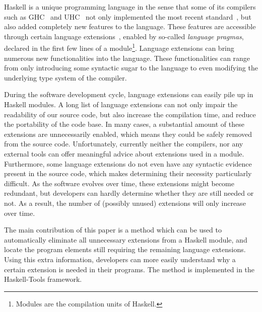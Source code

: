 \documentclass[main.tex]{subfiles}
\begin{document}
	
	Haskell is a unique programming language in the sense that some of its compilers such as GHC~\cite{ghc-bib} and UHC~\cite{uhc-bib} not only implemented the most recent standard~\cite{haskell2010-bib}, but also added completely new features to the language. These features are accessible through certain language extensions~\cite{ghc-users-guide-bib}, enabled by so-called \emph{language pragmas}, declared in the first few lines of a module\footnote{Modules are the compilation units of Haskell.}. Language extensions can bring numerous new functionalities into the language. These functionalities can range from only introducing some syntactic sugar to the language to even modifying the underlying type system of the compiler. 
	
	During the software development cycle, language extensions can easily pile up in Haskell modules. A long list of language extensions can not only impair the readability of our source code, but also increase the compilation time, and reduce the portability of the code base. In many cases, a substantial amount of these extensions are unnecessarily enabled, which means they could be safely removed from the source code. Unfortunately, currently neither the compilers, nor any external tools can offer meaningful advice about extensions used in a module. Furthermore, some language extensions do not even have any syntactic evidence present in the source code, which makes determining their necessity particularly difficult. As the software evolves over time, these extensions might become redundant, but developers can hardly determine whether they are still needed or not. As a result, the number of (possibly unused) extensions will only increase over time.
	
	The main contribution of this paper is a method which can be used to automatically eliminate all unnecessary extensions from a Haskell module, and locate the program elements still requiring the remaining language extensions. Using this extra information, developers can more easily understand why a certain extension is needed in their programs. The method is implemented in the Haskell-Tools framework.
	
\end{document}
